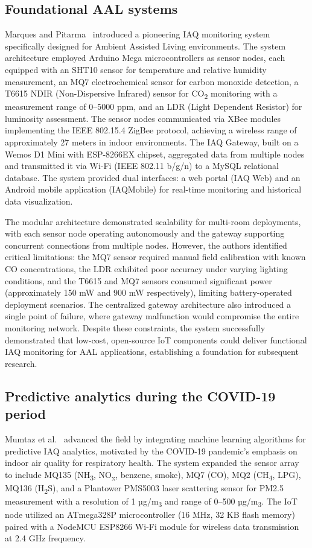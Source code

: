 \documentclass[12pt]{report}
\begin{document}
\subsection{Foundational AAL systems}
Marques and Pitarma~\cite{marques2016} introduced a pioneering IAQ monitoring system specifically designed for Ambient Assisted Living environments. The system architecture employed Arduino Mega microcontrollers as sensor nodes, each equipped with an SHT10 sensor for temperature and relative humidity measurement, an MQ7 electrochemical sensor for carbon monoxide detection, a T6615 NDIR (Non-Dispersive Infrared) sensor for CO\textsubscript{2} monitoring with a measurement range of 0--5000 ppm, and an LDR (Light Dependent Resistor) for luminosity assessment. The sensor nodes communicated via XBee modules implementing the IEEE 802.15.4 ZigBee protocol, achieving a wireless range of approximately 27 meters in indoor environments. The IAQ Gateway, built on a Wemos D1 Mini with ESP-8266EX chipset, aggregated data from multiple nodes and transmitted it via Wi-Fi (IEEE 802.11 b/g/n) to a MySQL relational database. The system provided dual interfaces: a web portal (IAQ Web) and an Android mobile application (IAQMobile) for real-time monitoring and historical data visualization.

The modular architecture demonstrated scalability for multi-room deployments, with each sensor node operating autonomously and the gateway supporting concurrent connections from multiple nodes. However, the authors identified critical limitations: the MQ7 sensor required manual field calibration with known CO concentrations, the LDR exhibited poor accuracy under varying lighting conditions, and the T6615 and MQ7 sensors consumed significant power (approximately 150 mW and 900 mW respectively), limiting battery-operated deployment scenarios. The centralized gateway architecture also introduced a single point of failure, where gateway malfunction would compromise the entire monitoring network. Despite these constraints, the system successfully demonstrated that low-cost, open-source IoT components could deliver functional IAQ monitoring for AAL applications, establishing a foundation for subsequent research.

\subsection{Predictive analytics during the COVID-19 period}
Mumtaz et al.~\cite{mumtaz2021} advanced the field by integrating machine learning algorithms for predictive IAQ analytics, motivated by the COVID-19 pandemic's emphasis on indoor air quality for respiratory health. The system expanded the sensor array to include MQ135 (NH\textsubscript{3}, NO\textsubscript{x}, benzene, smoke), MQ7 (CO), MQ2 (CH\textsubscript{4}, LPG), MQ136 (H\textsubscript{2}S), and a Plantower PMS5003 laser scattering sensor for PM2.5 measurement with a resolution of 1 µg/m\textsubscript{3} and range of 0--500 µg/m\textsubscript{3}. The IoT node utilized an ATmega328P microcontroller (16 MHz, 32 KB flash memory) paired with a NodeMCU ESP8266 Wi-Fi module for wireless data transmission at 2.4 GHz frequency.
\end{document}
